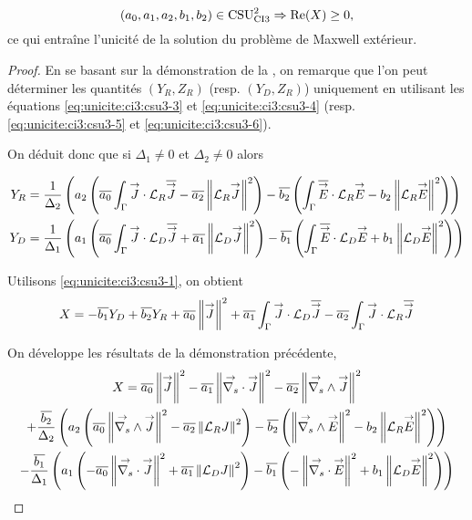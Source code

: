   
 \begin{prop}
    \label{prop:csu:ci3-2}
    \begin{equation*}
      (a_0,a_1,a_2,b_1,b_2) \in \CSU[2]{CI3} \Rightarrow \Re(X) \ge 0,
    \end{equation*}
    ce qui entraîne l'unicité de la solution du problème de Maxwell extérieur.
  \end{prop}

  \begin{proof}
    En se basant sur la démonstration de la , on remarque que l'on peut déterminer les quantités \((Y_R,Z_R)\) (resp. \((Y_D,Z_R)\)) uniquement en utilisant les équations \eqref{eq:unicite:ci3:csu3-3} et \eqref{eq:unicite:ci3:csu3-4} (resp. \eqref{eq:unicite:ci3:csu3-5} et \eqref{eq:unicite:ci3:csu3-6}).

    On déduit donc que si \(\Delta_1 \not = 0\) et \(\Delta_2 \not = 0\) alors

    \begin{align*}
      Y_R &= \frac{1}{\Delta_2}\left(a_2\left(\conj{a_0}\int_\Gamma \vJ\cdot\LR\conj{\vJ} - \conj{a_2}\norm{\LR \vJ}^2\right)  -\conj{b_2}\left(\int_\Gamma \conj{\vE}\cdot\LR{\vE} - b_2 \norm{\LR \vE}^2\right)\right) \\
      Y_D &= \frac{1}{\Delta_1}\left(a_1\left(\conj{a_0}\int_\Gamma \vJ\cdot\LD\conj{\vJ} + \conj{a_1}\norm{\LD \vJ}^2\right)  -\conj{b_1}\left(\int_\Gamma \conj{\vE}\cdot\LD{\vE} + b_1 \norm{\LD \vE}^2\right)\right)
    \end{align*}

    Utilisons \eqref{eq:unicite:ci3:csu3-1}, on obtient
    \begin{equation*}
      X = -\conj{b_1} Y_D + \conj{b_2} Y_R + \conj{a_0} \norm{\vJ}^2 + \conj{a_1} \int_\Gamma \vJ \cdot \LD \conj{\vJ} - \conj{a_2} \int_\Gamma \vJ \cdot \LR \conj{\vJ}
    \end{equation*}

    On développe les résultats de la démonstration précédente,
    \begin{multline*}
      X = \conj{a_0} \norm{\vJ }^2 - \conj{a_1} \norm{\vdivs \vJ }^2 - \conj{a_2} \norm{\vrots \vJ }^2
      \\
      + \frac{\conj{b_2}}{\Delta_2}\left(a_2\left(\conj{a_0}\norm{\vrots \vJ}^2 - \conj{a_2}\norm{\LR J}^2\right)  -\conj{b_2}\left(\norm{\vrots\vE}^2 - b_2 \norm{\LR \vE }^2\right)\right)
      \\
      - \frac{\conj{b_1}}{\Delta_1}\left(a_1\left(-\conj{a_0}\norm{\vdivs\vJ}^2 + \conj{a_1}\norm{\LD J}^2\right)  -\conj{b_1}\left(-\norm{\vdivs\vE}^2 + b_1 \norm{\LD \vE }^2\right)\right)
    \end{multline*}


\end{proof}
